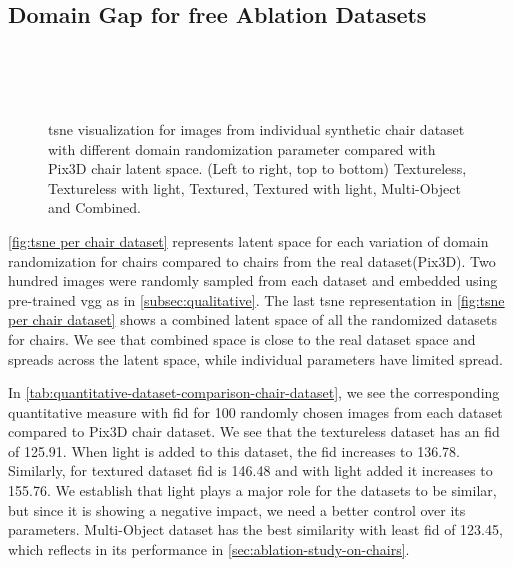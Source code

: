 \subsection{Domain Gap for \gls{free} Ablation Datasets}


\begin{figure}[!ht]
    \centering
    \resizebox{0.49\linewidth}{6cm}{}
    \resizebox{0.49\linewidth}{6cm}{}\\
    \resizebox{0.49\linewidth}{6cm}{}
    \resizebox{0.49\linewidth}{6cm}{}\\
    \resizebox{0.49\linewidth}{6cm}{}
    \resizebox{0.49\linewidth}{6cm}{}\\
    \caption[\gls{tsne} for Ablation Datasets]{\gls{tsne} visualization for images from individual synthetic chair dataset with different domain randomization parameter compared with Pix3D chair latent space.
        (Left to right, top to bottom) Textureless, Textureless with light, Textured, Textured with light, Multi-Object and Combined.}
    \label{fig:tsne per chair dataset}
\end{figure}

\autoref{fig:tsne per chair dataset} represents latent space for each variation of domain randomization for chairs compared to chairs from the real dataset(Pix3D).
Two hundred images were randomly sampled from each dataset and embedded using pre-trained \gls{vgg} as in \autoref{subsec:qualitative}.
The last \gls{tsne} representation in \autoref{fig:tsne per chair dataset} shows a combined latent space of all the randomized datasets for chairs.
We see that combined space is close to the real dataset space and spreads across the latent space, while individual parameters have limited spread.

In \autoref{tab:quantitative-dataset-comparison-chair-dataset}, we see the corresponding quantitative measure with \gls{fid} for 100 randomly chosen images from each dataset compared to Pix3D chair dataset.
We see that the textureless dataset has an \gls{fid} of 125.91.
When light is added to this dataset, the \gls{fid} increases to 136.78.
Similarly, for textured dataset \gls{fid} is 146.48 and with light added it increases to 155.76.
We establish that light plays a major role for the datasets to be similar, but since it is showing a negative impact, we need a better control over its parameters.
Multi-Object dataset has the best similarity with least \gls{fid} of 123.45, which reflects in its performance in \autoref{sec:ablation-study-on-chairs}.

